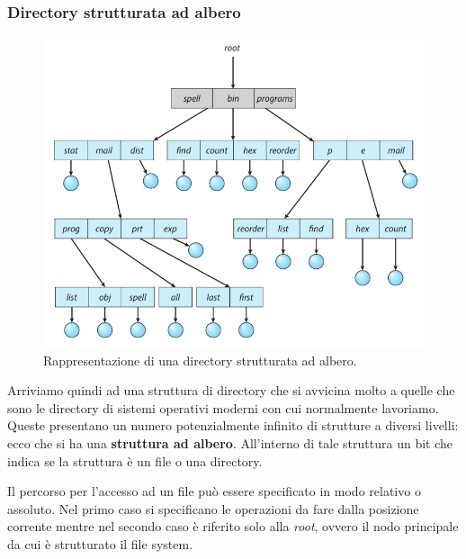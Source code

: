 % 
\subsubsection{Directory strutturata ad albero}
\begin{figure}[h]
    \centering
    \includegraphics[width = .6\textwidth]{../res/imgs/file system interface/tree-structured dir.png}
    \caption{Rappresentazione di una directory strutturata ad albero.}
    \label{fig:tree-structured dir}
\end{figure}
Arriviamo quindi ad una struttura di directory che si avvicina molto a quelle che sono le directory di sistemi operativi moderni con cui normalmente lavoriamo. Queste presentano un numero potenzialmente infinito di strutture a diversi livelli: ecco che si ha una \textbf{struttura ad albero}. All'interno di tale struttura un bit che indica se la struttura è un file o una directory. 

Il percorso per l'accesso ad un file può essere specificato in modo relativo o assoluto. Nel primo caso si specificano le operazioni da fare dalla posizione corrente mentre nel secondo caso è riferito solo alla \textit{root}, ovvero il nodo principale da cui è strutturato il file system.

